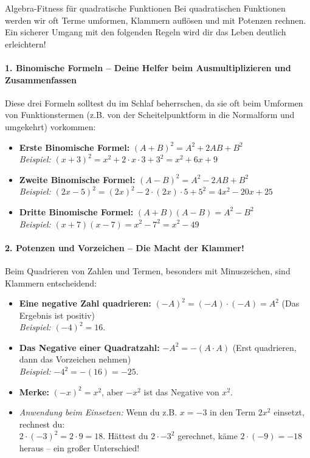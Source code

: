\begin{erinnerungsboxumgebung}{Algebra-Fitness für quadratische Funktionen}
Bei quadratischen Funktionen werden wir oft Terme umformen, Klammern auflösen und mit Potenzen rechnen. Ein sicherer Umgang mit den folgenden Regeln wird dir das Leben deutlich erleichtern!

\paragraph{1. Binomische Formeln – Deine Helfer beim Ausmultiplizieren und Zusammenfassen}
Diese drei Formeln solltest du im Schlaf beherrschen, da sie oft beim Umformen von Funktionstermen (z.B. von der Scheitelpunktform in die Normalform und umgekehrt) vorkommen:
\begin{itemize}
    \item \textbf{Erste Binomische Formel:} $(A+B)^2 = A^2 + 2AB + B^2$ \\
    \textit{Beispiel:} $(x+3)^2 = x^2 + 2 \cdot x \cdot 3 + 3^2 = x^2 + 6x + 9$
    \item \textbf{Zweite Binomische Formel:} $(A-B)^2 = A^2 - 2AB + B^2$ \\
    \textit{Beispiel:} $(2x-5)^2 = (2x)^2 - 2 \cdot (2x) \cdot 5 + 5^2 = 4x^2 - 20x + 25$
    \item \textbf{Dritte Binomische Formel:} $(A+B)(A-B) = A^2 - B^2$ \\
    \textit{Beispiel:} $(x+7)(x-7) = x^2 - 7^2 = x^2 - 49$
\end{itemize}

\paragraph{2. Potenzen und Vorzeichen – Die Macht der Klammer!}
Beim Quadrieren von Zahlen und Termen, besonders mit Minuszeichen, sind Klammern entscheidend:
\begin{itemize}
    \item \textbf{Eine negative Zahl quadrieren:} $(-A)^2 = (-A) \cdot (-A) = A^2$ (Das Ergebnis ist positiv) \\
    \textit{Beispiel:} $(-4)^2 = 16$.
    \item \textbf{Das Negative einer Quadratzahl:} $-A^2 = -(A \cdot A)$ (Erst quadrieren, dann das Vorzeichen nehmen) \\
    \textit{Beispiel:} $-4^2 = -(16) = -25$.
    \item \textbf{Merke:} $(-x)^2 = x^2$, aber $-x^2$ ist das Negative von $x^2$.
    \item \textit{Anwendung beim Einsetzen:} Wenn du z.B. $x=-3$ in den Term $2x^2$ einsetzt, rechnest du: \\ $2 \cdot (-3)^2 = 2 \cdot 9 = 18$. Hättest du $2 \cdot -3^2$ gerechnet, käme $2 \cdot (-9) = -18$ heraus – ein großer Unterschied!
\end{itemize}


\end{erinnerungsboxumgebung}
